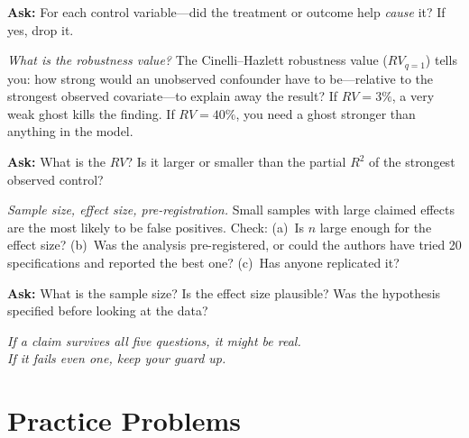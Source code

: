 \documentclass[11pt,a4paper]{article}
\theoremstyle{definition}
\theoremstyle{plain}
\theoremstyle{remark}
\begin{document}
\begin{tcolorbox}[colback=biasred!5, colframe=biasred!80!black, fonttitle=\bfseries\large,
  title={\centering Statistical BS Detector}, breakable,
  boxrule=1.5pt, arc=4pt, top=8pt, bottom=8pt]
\begin{tcolorbox}[colback=truthgold!10, colframe=truthgold!80!black, fonttitle=\bfseries,
  title={3.\quad ``Is this a collider?''}, boxrule=0.8pt]
\smallskip
\textbf{Ask:} For each control variable---did the treatment or outcome help \emph{cause} it? If yes, drop it.
\end{tcolorbox}

\medskip

\begin{tcolorbox}[colback=truthgold!10, colframe=truthgold!80!black, fonttitle=\bfseries,
  title={4.\quad ``How fragile is this?''}, boxrule=0.8pt]
\emph{What is the robustness value?}
The Cinelli--Hazlett robustness value ($RV_{q=1}$) tells you: how strong would an unobserved confounder have to be---relative to the strongest observed covariate---to explain away the result? If $RV = 3\%$, a very weak ghost kills the finding. If $RV = 40\%$, you need a ghost stronger than anything in the model.

\smallskip
\textbf{Ask:} What is the $RV$? Is it larger or smaller than the partial $R^2$ of the strongest observed control?
\end{tcolorbox}

\medskip

\begin{tcolorbox}[colback=truthgold!10, colframe=truthgold!80!black, fonttitle=\bfseries,
  title={5.\quad ``Would this replicate?''}, boxrule=0.8pt]
\emph{Sample size, effect size, pre-registration.}
Small samples with large claimed effects are the most likely to be false positives. Check: (a)~Is $n$ large enough for the effect size? (b)~Was the analysis pre-registered, or could the authors have tried 20 specifications and reported the best one? (c)~Has anyone replicated it?

\smallskip
\textbf{Ask:} What is the sample size? Is the effect size plausible? Was the hypothesis specified before looking at the data?
\end{tcolorbox}

\bigskip

\begin{center}
\textit{If a claim survives all five questions, it might be real.\\
If it fails even one, keep your guard up.}
\end{center}

\end{tcolorbox}

\section{Practice Problems}\label{app:practice}
\end{document}
